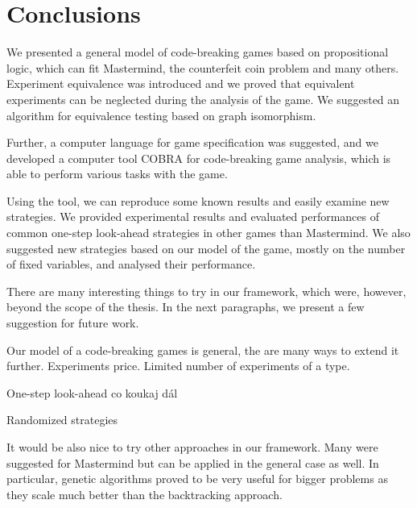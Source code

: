 \chapter{Conclusions}

We presented a general model of code-breaking games based on propositional logic,
  which can fit Mastermind, the counterfeit coin problem and many others.
Experiment equivalence was introduced and we proved that
  equivalent experiments can be neglected during the analysis of the game.
We suggested an algorithm for equivalence testing based on graph isomorphism.

Further, a computer language for game specification was suggested,
  and we developed a computer tool COBRA for code-breaking game analysis,
  which is able to perform various tasks with the game.

Using the tool, we can reproduce some known results and easily examine
  new strategies.
We provided experimental results and evaluated performances of
  common one-step look-ahead strategies in other games than Mastermind.
We also suggested new strategies based on our model of the game,
  mostly on the number of fixed variables, and analysed their performance.

There are many interesting things to try in our framework,
  which were, however, beyond the scope of the thesis.
In the next paragraphs, we present a few suggestion for future work.

Our model of a code-breaking games is general,
  the are many ways to extend it further.
Experiments price.
Limited number of experiments of a type.

One-step look-ahead co koukaj dál

Randomized strategies


It would be also nice to try other approaches in our framework.
Many were suggested for Mastermind but can be applied in the general case as well.
In particular, genetic algorithms proved to be very useful for bigger problems
  as they scale much better than the backtracking approach.
